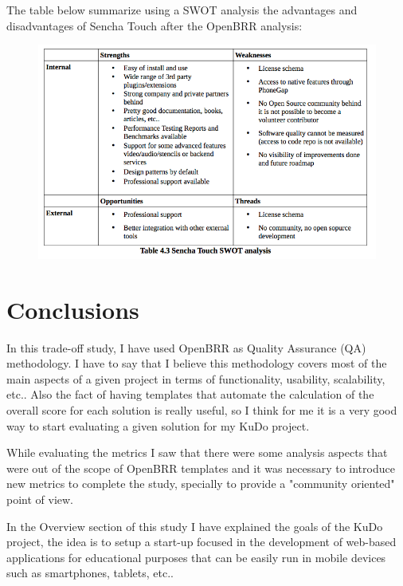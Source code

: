 \documentclass[a4paper,12pt]{book}
\begin{document}
The table below summarize using a SWOT analysis the advantages and disadvantages of Sencha Touch after the OpenBRR analysis:

\begin{figure}[H]
    \centering
    \includegraphics[width=13cm, keepaspectratio]{img/table43.png}
 \end{figure}


\chapter{Conclusions}
\label{chap:conclusions}

In this trade-off study, I have used OpenBRR as Quality Assurance (QA) methodology. I have to say that I believe this methodology covers most of the main aspects of a given project in terms of functionality, usability, scalability, etc.. Also the fact of having templates that automate the calculation of the overall score for each solution is really useful, so I think for me it is a very good way to start evaluating a given solution for my KuDo project.

While evaluating the metrics I saw that there were some analysis aspects that were out of the scope of OpenBRR templates and it was necessary to introduce new metrics to complete the study, specially to provide a "community oriented" point of view.

In the Overview section of this study I have explained the goals of the KuDo project, the idea is to setup a start-up focused in the development of web-based applications for educational purposes that can be easily run in mobile devices such as smartphones, tablets, etc..
\end{document}

